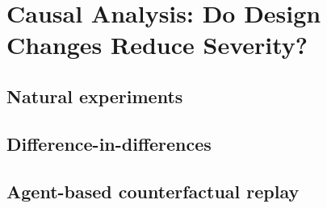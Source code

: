 \section{Causal Analysis: Do Design Changes Reduce Severity?}\label{sec:causal}

\subsection{Natural experiments}\label{sec:causal-experiments}

\subsection{Difference-in-differences}\label{sec:causal-did}

\subsection{Agent-based counterfactual replay}\label{sec:causal-replay}
